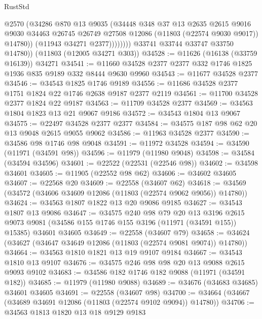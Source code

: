 \begin{lexlean}{RustStd}
\begin{coremodule}
                      @2570
                      (@34286
                        @870
                        @13
                        @9035
                        (@34448
                          @348
                          @37
                          @13
                          @2635
                          @2615
                          @9016
                          @9030
                          @34463
                          @26745
                          @26749
                          @27508
                          @12086
                          (@11803 (@22574 @9030 @9017))
                          @14780))
                      (@11943 @34271 @2377))))))))
        @33741
        @33744
        @33747
        @33750
        @14780))
    (@11803 (@12005 @34271 @303))
@34528 := @11626 (@16138 (@33759 @16139)) @34271
@34541 := @11660 @34528 @2377 @2377 @332 @1746 @1825 @1936 @835 @9189 @332 @8444 @9630 @9960
@34543 := @11677 @34528 @2377
@34546 := @34543 @1825 @1746 @9189
@34556 := @11686 @34528 @2377 @1751 @1824 @22 @1746 @2638 @9187 @2377 @2119
@34561 := @11700 @34528 @2377 @1824 @22 @9187
@34563 := @11709 @34528 @2377
@34569 := @34563 @1804 @1823 @13 @21 @9067 @9186
@34572 := @34543 @1804 @13 @9067
@34575 := @22497 @34528 @2377 @2377
@34584 := @34575 @187 @98 @62 @20 @13 @9048 @2615 @9055 @9062
@34586 := @11963 @34528 @2377
@34590 := @34586 @98 @1746 @98 @9048
@34591 := @11972 @34528
@34594 := @34590 (@11971 (@34591 @98))
@34596 := @11979 (@11980 @9048)
@34598 := @34584 (@34594 @34596)
@34601 := @22522 (@22531 (@22546 @98))
@34602 := @34598 @34601
@34605 := @11905 (@22552 @98 @62)
@34606 := @34602 @34605
@34607 := @22568 @20
@34609 := @22558 (@34607 @62)
@34618 := @34569 (@34572 (@34606 @34609 @12086 (@11803 (@22574 @9062 @9056)) @14780))
@34624 := @34563 @1807 @1822 @13 @20 @9086 @9185
@34627 := @34543 @1807 @13 @9086
@34647 := @34575
    @240
    @98
    @79
    @20
    @13
    @3196
    @2615
    @9073
    @9081
    (@34586 @155 @1746 @155 @3196 (@11971 (@34591 @155)) @15385)
    @34601
    @34605
@34649 := @22558 (@34607 @79)
@34658 := @34624 (@34627 (@34647 @34649 @12086 (@11803 (@22574 @9081 @9074)) @14780))
@34664 := @34563 @1810 @1821 @13 @19 @9107 @9184
@34667 := @34543 @1810 @13 @9107
@34676 := @34575 @246 @98 @98 @20 @13 @9088 @2615 @9093 @9102
@34683 := @34586 @182 @1746 @182 @9088 (@11971 (@34591 @182))
@34685 := @11979 (@11980 @9088)
@34689 := @34676 (@34683 @34685) @34601 @34605
@34691 := @22558 (@34607 @98)
@34700 := @34664 (@34667 (@34689 @34691 @12086 (@11803 (@22574 @9102 @9094)) @14780))
@34706 := @34563 @1813 @1820 @13 @18 @9129 @9183

\end{coremodule}
\end{lexlean}
